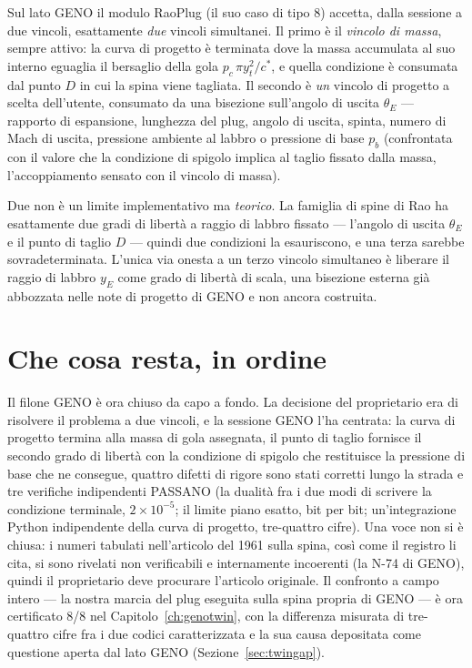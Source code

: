 Sul lato GENO il modulo RaoPlug (il suo caso di tipo 8) accetta, dalla
sessione a due vincoli, esattamente \emph{due} vincoli simultanei. Il
primo è il \emph{vincolo di massa}, sempre attivo: la curva di
progetto è terminata dove la massa accumulata al suo interno eguaglia
il bersaglio della gola $p_c\,\pi y_t^2/c^{*}$, e quella condizione è
consumata dal punto $D$ in cui la spina viene tagliata. Il secondo è
\emph{un} vincolo di progetto a scelta dell'utente, consumato da una
bisezione sull'angolo di uscita $\theta_E$ --- rapporto di espansione,
lunghezza del plug, angolo di uscita, spinta, numero di Mach di
uscita, pressione ambiente al labbro o pressione di base $p_b$
(confrontata con il valore che la condizione di spigolo implica al
taglio fissato dalla massa, l'accoppiamento sensato con il vincolo di
massa).

Due non è un limite implementativo ma \emph{teorico}. La famiglia di
spine di Rao ha esattamente due gradi di libertà a raggio di labbro
fissato --- l'angolo di uscita $\theta_E$ e il punto di taglio $D$ ---
quindi due condizioni la esauriscono, e una terza sarebbe
sovradeterminata. L'unica via onesta a un terzo vincolo simultaneo è
liberare il raggio di labbro $y_E$ come grado di libertà di scala, una
bisezione esterna già abbozzata nelle note di progetto di GENO e non
ancora costruita.

\section{Che cosa resta, in ordine}

Il filone GENO è ora chiuso da capo a fondo. La decisione del
proprietario era di risolvere il problema a due vincoli, e la sessione
GENO l'ha centrata: la curva di progetto termina alla massa di gola
assegnata, il punto di taglio fornisce il secondo grado di libertà con
la condizione di spigolo che restituisce la pressione di base che ne
consegue, quattro difetti di rigore sono stati corretti lungo la
strada e tre verifiche indipendenti PASSANO (la dualità fra i due modi
di scrivere la condizione terminale, $2\times10^{-5}$; il limite piano
esatto, bit per bit; un'integrazione Python indipendente della curva
di progetto, tre-quattro cifre). Una voce non si è chiusa: i numeri
tabulati nell'articolo del 1961 sulla spina, così come il registro li
cita, si sono rivelati non verificabili e internamente incoerenti (la
N-74 di GENO), quindi il proprietario deve procurare l'articolo
originale. Il confronto a campo intero --- la nostra marcia del plug
eseguita sulla spina propria di GENO --- è ora certificato 8/8 nel
Capitolo~\ref{ch:genotwin}, con la differenza misurata di
tre-quattro cifre fra i due codici caratterizzata e la sua causa
depositata come questione aperta dal lato GENO
(Sezione~\ref{sec:twingap}).

